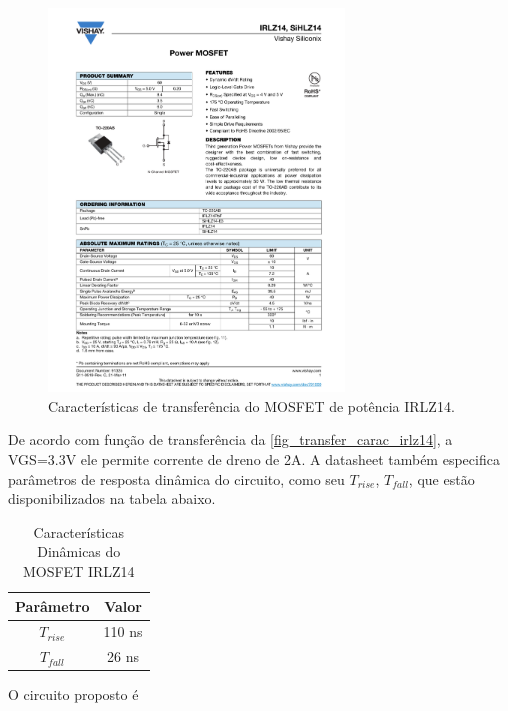 		\begin{figure}[htb]
			\caption{\label{fig_transfer_carac_irlz14} Características de transferência do MOSFET de potência IRLZ14.}
			\centering		%
			\includegraphics[page=3, width=0.7\textwidth, trim={12cm 16.5cm 2.2cm 5cm}, clip]{circuits/irlz14.pdf}
		\end{figure}
	
		De acordo com função de transferência da \autoref{fig_transfer_carac_irlz14}, a VGS=3.3V ele permite corrente de dreno de 2A. A datasheet também especifica parâmetros de resposta dinâmica do circuito, como seu $T_{rise}$, $T_{fall}$, que estão disponibilizados na tabela abaixo.
		
		\begin{table}[ht]
			\caption{Características Dinâmicas do MOSFET IRLZ14}
			\centering
			\begin{tabular}{c c}
				\hline
				Parâmetro  & Valor  \\ \hline
				$T_{rise}$ & 110 ns \\
				$T_{fall}$ & 26 ns  \\ \hline
			\end{tabular}
			\label{tab_irlz14_timing}
		\end{table}
	
		O circuito proposto é 

